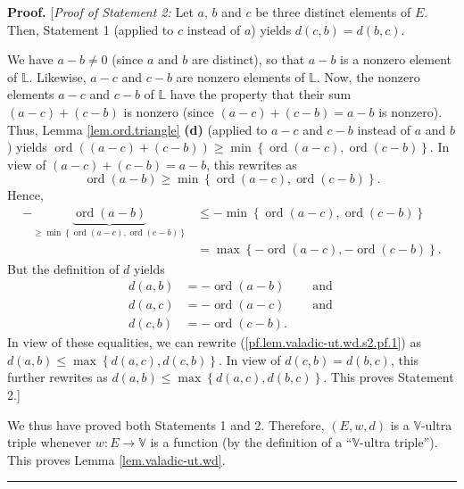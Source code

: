 \documentclass[numbers=enddot,12pt,final,onecolumn,notitlepage]{scrartcl}%
\theoremstyle{definition}
\newenvironment{proof}[1][Proof]{\noindent\textbf{#1.} }{\ \rule{0.5em}{0.5em}}
\renewcommand{\leq}{\leqslant}
\renewcommand{\geq}{\geqslant}
\theoremstyle{plainsl}
\begin{document}
\begin{proof}
[\textit{Proof of Statement 2:} Let $a$, $b$ and $c$ be three distinct
elements of $E$. Then, Statement 1 (applied to $c$ instead of $a$) yields
$d\left(  c,b\right)  =d\left(  b,c\right)  $.

We have $a-b\neq0$ (since $a$ and $b$ are distinct), so that $a-b$ is a
nonzero element of $\mathbb{L}$. Likewise, $a-c$ and $c-b$ are nonzero
elements of $\mathbb{L}$. Now, the nonzero elements $a-c$ and $c-b$ of
$\mathbb{L}$ have the property that their sum $\left(  a-c\right)  +\left(
c-b\right)  $ is nonzero (since $\left(  a-c\right)  +\left(  c-b\right)
=a-b$ is nonzero). Thus, Lemma \ref{lem.ord.triangle} \textbf{(d)} (applied to
$a-c$ and $c-b$ instead of $a$ and $b$) yields $\operatorname*{ord}\left(
\left(  a-c\right)  +\left(  c-b\right)  \right)  \geq\min\left\{
\operatorname*{ord}\left(  a-c\right)  ,\operatorname*{ord}\left(  c-b\right)
\right\}  $. In view of $\left(  a-c\right)  +\left(  c-b\right)  =a-b$, this
rewrites as%
\[
\operatorname*{ord}\left(  a-b\right)  \geq\min\left\{  \operatorname*{ord}%
\left(  a-c\right)  ,\operatorname*{ord}\left(  c-b\right)  \right\}  .
\]
Hence,%
\begin{align}
-\underbrace{\operatorname*{ord}\left(  a-b\right)  }_{\geq\min\left\{
\operatorname*{ord}\left(  a-c\right)  ,\operatorname*{ord}\left(  c-b\right)
\right\}  }  &  \leq-\min\left\{  \operatorname*{ord}\left(  a-c\right)
,\operatorname*{ord}\left(  c-b\right)  \right\} \nonumber\\
&  =\max\left\{  -\operatorname*{ord}\left(  a-c\right)  ,-\operatorname*{ord}%
\left(  c-b\right)  \right\}  . \label{pf.lem.valadic-ut.wd.s2.pf.1}%
\end{align}
But the definition of $d$ yields%
\begin{align*}
d\left(  a,b\right)   &  =-\operatorname*{ord}\left(  a-b\right)
\ \ \ \ \ \ \ \ \ \ \text{and}\\
d\left(  a,c\right)   &  =-\operatorname*{ord}\left(  a-c\right)
\ \ \ \ \ \ \ \ \ \ \text{and}\ \\
d\left(  c,b\right)   &  =-\operatorname*{ord}\left(  c-b\right)  .
\end{align*}
In view of these equalities, we can rewrite
(\ref{pf.lem.valadic-ut.wd.s2.pf.1}) as $d\left(  a,b\right)  \leq\max\left\{
d\left(  a,c\right)  ,d\left(  c,b\right)  \right\}  $. In view of $d\left(
c,b\right)  =d\left(  b,c\right)  $, this further rewrites as $d\left(
a,b\right)  \leq\max\left\{  d\left(  a,c\right)  ,d\left(  b,c\right)
\right\}  $. This proves Statement 2.] \medskip

We thus have proved both Statements 1 and 2. Therefore, $\left(  E,w,d\right)
$ is a $\mathbb{V}$-ultra triple whenever $w:E\rightarrow\mathbb{V}$ is a
function (by the definition of a \textquotedblleft$\mathbb{V}$-ultra
triple\textquotedblright). This proves Lemma \ref{lem.valadic-ut.wd}.
\end{proof}
\end{document}
